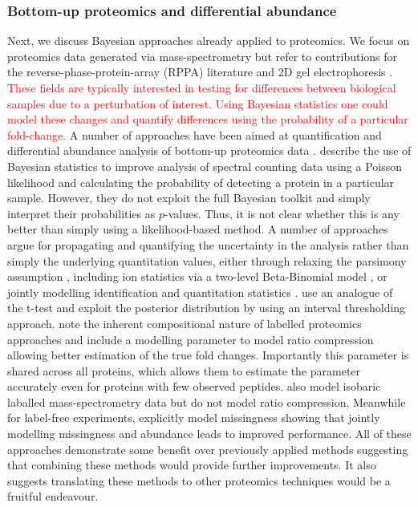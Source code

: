 \documentclass[12pt,english, journal=jpr, layout=twocolumn]{article}
\begin{document}
\subsubsection{Bottom-up proteomics and differential abundance}
Next, we discuss Bayesian approaches already applied to proteomics. We focus on proteomics data generated via mass-spectrometry but refer to contributions for the reverse-phase-protein-array (RPPA) literature \citep{Crook::2019, Ni::2019, Maity::2020} and 2D gel electrophoresis \citep{Morris::2011}. \textcolor{red}{These fields are typically interested in testing for differences between biological samples due to a perturbation of interest. Using Bayesian statistics one could model these changes and quantify differences using the probability of a particular fold-change.} A number of approaches have been aimed at quantification and differential abundance analysis of bottom-up proteomics data \citep{Phillips::2021, The::2021, The::2019, Santra::2016, Peshkin::2019, Millikin::2020, Serang::2013, OBrien::2018, Serang::2012, Carvalho::2011}. \citet{Carvalho::2011} describe the use of Bayesian statistics to improve analysis of spectral counting data using a Poisson likelihood and calculating the probability of detecting a protein in a particular sample. However, they do not exploit the full Bayesian toolkit and simply interpret their probabilities as $p$-values. Thus, it is not clear whether this is any better than simply using a likelihood-based method. A number of approaches \citep{The::2021, The::2019, Peshkin::2019, Serang::2012} argue for propagating and quantifying the uncertainty in the analysis rather than simply the underlying quantitation values, either through relaxing the parsimony assumption \citep{Serang::2012}, including ion statistics via a two-level Beta-Binomial model \citep{Peshkin::2019}, or jointly modelling identification and quantitation statistics \citep{The::2019, The::2021}. \citet{Millikin::2020} use an analogue of the t-test and exploit the posterior distribution by using an interval thresholding approach. \citet{OBrien::2018} note the inherent compositional nature of labelled proteomics approaches and include a modelling parameter to model ratio compression allowing better estimation of the true fold changes. Importantly this parameter is shared across all proteins, which allows them to estimate the parameter accurately even for proteins with few observed peptides. \citet{Jow::2014} also model isobaric laballed mass-spectrometry data but do not model ratio compression. Meanwhile for label-free experiments, \citet{OBrien::2018b} explicitly model missingness showing that jointly modelling missingness and abundance leads to improved performance. All of these approaches demonstrate some benefit over previously applied methods suggesting that combining these methods would provide further improvements. It also suggests translating these methods to other proteomics techniques would be a fruitful endeavour.
\end{document}
